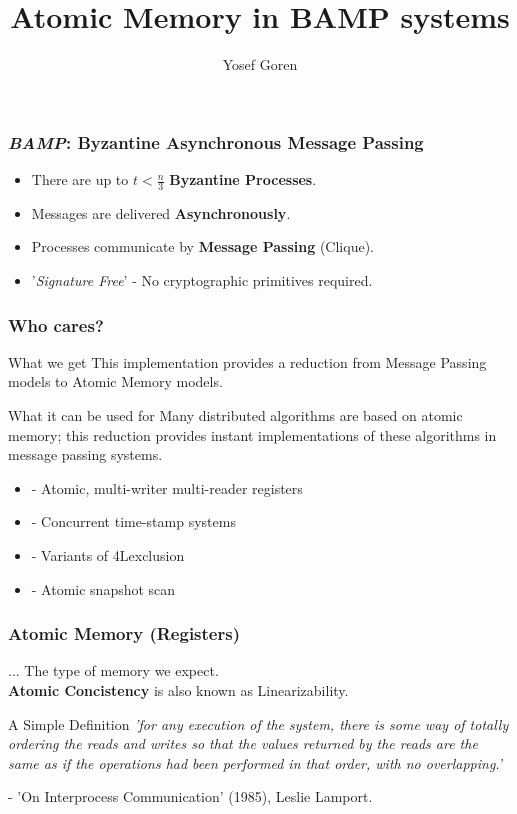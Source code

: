 \documentclass{beamer}
\begin{document}
\title{Atomic Memory in BAMP systems}
\author{Yosef Goren}
\date{}

\begin{frame}
    \frametitle{\emph{BAMP}: Byzantine Asynchronous Message Passing}
    \begin{itemize}
        \item There are up to $t<\frac{n}{3}$ \textbf{Byzantine Processes}.
        \item Messages are delivered \textbf{Asynchronously}.
        \item Processes communicate by \textbf{Message Passing} (Clique).
        \item '\emph{Signature Free}' - No cryptographic primitives required.
    \end{itemize}
\end{frame}


\begin{frame}
    \frametitle{Who cares?}
    \begin{block}{What we get}
        This implementation provides a reduction from Message Passing models to Atomic Memory models.
    \end{block}
    \begin{block}{What it can be used for}
        Many distributed algorithms are based on atomic memory; this reduction provides instant implementations
        of these algorithms in message passing systems.
    \end{block}
    \begin{examples}
        \begin{itemize}
            \item - Atomic, multi-writer multi-reader registers 
            \item - Concurrent time-stamp systems
            \item - Variants of 4Lexclusion
            \item - Atomic snapshot scan
        \end{itemize}
    \end{examples}
\end{frame}

\begin{frame}
    \frametitle{Atomic Memory (Registers)}
    ... The type of memory we expect.\\
    \textbf{Atomic Concistency} is also known as Linearizability.
    \begin{block}{A Simple Definition}
        \emph{'for any execution of the system, there is some way of totally ordering
        the reads and writes so that the values returned by the reads are the same
        as if the operations had been performed in that order, with no overlapping.'}\\
    \end{block}
    - 'On Interprocess Communication' (1985), Leslie Lamport.
\end{frame}
\end{document}
